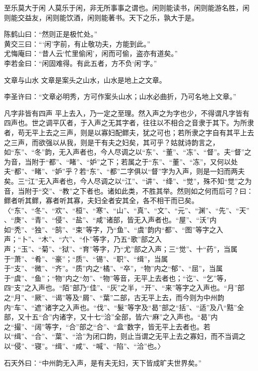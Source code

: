 \begin{yulu}{至乐莫大于闲}
人莫乐于闲，非无所事事之谓也。闲则能读书，闲则能游名胜，闲则能交益友，闲则能饮酒，闲则能著书。天下之乐，孰大于是。
\begin{comments}
陈鹤山曰：“然则正是极忙处。” \\
黄交三曰：“‘闲’字前，有止敬功夫，方能到此。” \\
尤悔庵曰：“昔人云‘忙里偷闲’，闲而可偷，盗亦有道矣。” \\
李若金曰：“闲固难得。有此五者，方不负‘闲’字。”
\end{comments}
\end{yulu}

\begin{yulu}{文章与山水}
文章是案头之山水，山水是地上之文章。
\begin{comments}
李圣许曰：“文章必明秀，方可作案头山水；山水必曲折，乃可名地上文章。”
\end{comments}
\end{yulu}

\begin{yulu}{凡字非皆有四声}
平上去入，乃一定之至理。然入声之为字也少，不得谓凡字皆有四声也。世之调平仄者，于入声之无其字者，往往以不相合之音隶于其下。为所隶者，苟无平上去之三声，则是以寡妇配鳏夫，犹之可也；若所隶之字自有其平上去之三声，而欲强以从我，则是干有夫之妇矣，其可乎？姑就诗韵言之，如“东”、“冬”韵，无入声者也，今人尽调之以“东”、“董”、“冻”、“督”。夫“督”之为音，当附于“都”、“睹”、“妒”之下；若属之于“东”、“董”、“冻”，又何以处夫“都”、“睹”、“妒”乎？若“东”、“都”二字俱以“督”字为入声，则是一妇而两夫矣。三“江”无入声者也，今人尽调之以“江”、“讲”、“绛”、“觉”，殊不知“觉”之为音，当附于“交”、“教”之下者也。诸如此类，不胜其举。然则如之何而后可？曰：鳏者听其鳏，寡者听其寡，夫妇全者安其全，各不相干而已矣。〈“东”、“冬”、“欢”、“桓”、“寒”、“山”、“真”、“文”、“元”、“渊”、“先”、“天”、“庚”、“青”、“侵”、“盐”、“咸”诸部，皆无入声者也。“屋”、“沃”内如“秃”、“独”、“鹄”、“束”等字，乃“鱼”、“虞”韵内“都”、“图”等字之入声；“卜”、“木”、“六”、“仆”等字，乃五“歌”部之入声；“玉”、“菊”、“狱”、“育”等字，乃“尤”部之入声；三“觉”、十“药”，当属于“萧”、“肴”、“豪”；“质”、“锡”、“职”、“缉”，当属于“支”、“微”、“齐”。“质”内之“橘”、“卒”，“物”内之“郁”、“屈”，当属于“虞”、“鱼”；“物”内之“勿”、“物”等音，无平上去者也；“讫”、“乞”等，四“支”之入声也。“陌”部乃“佳”、“灰”之半，“开”、“来”等字之入声也。“月”部之“月”、“厥”、“谒”等及“屑”、“葉”二部，古无平上去，而今则为中州韵内“车”、“遮”诸字之入声也。“伐”、“髮”等字及“曷”部之“括”、“适”及八“黠”全部，又十五“合”内诸字，又十七“洽”全部，皆六“麻”之入声也。“曷”内之“撮”、“阔”等字，“合”部之“合”、“盒”数字，皆无平上去者也。若以“缉”、“合”、“葉”、“洽”为闭口韵，则止当谓之无平上去之寡妇，而不当调之以“侵”、“寝”。“缉”、“咸”、“喊”、“陷”、“洽”也。〉
\begin{comments}
石天外曰：“中州韵无入声，是有夫无妇，天下皆成旷夫世界矣。”
\end{comments}
\end{yulu}

